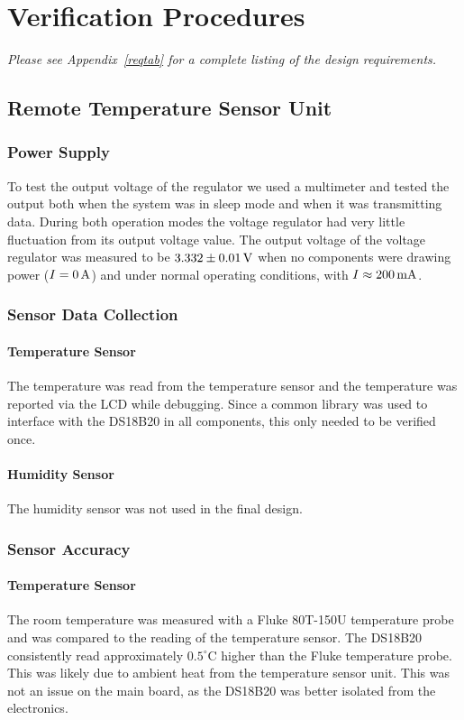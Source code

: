 \section{Verification Procedures}
\emph{Please see Appendix~\ref{reqtab} for a complete listing of the design requirements.}
\subsection{Remote Temperature Sensor Unit}
\subsubsection{Power Supply}
To test the output voltage of the regulator we used a multimeter and tested the output both when the system was in sleep mode and when it was transmitting data. During both operation modes the voltage regulator had very little fluctuation from its output voltage value. The output voltage of the voltage regulator was measured to be $3.332 \pm 0.01\mbox{\,V}$ when no components were drawing power ($I=0\mbox{\,A}$) and under normal operating conditions, with $I\approx200\mbox{\,mA}$. 

\subsubsection{Sensor Data Collection}
\paragraph{Temperature Sensor}
The temperature was read from the temperature sensor and the temperature was reported via the LCD while debugging.  Since a common library was used to interface with the DS18B20 in all components, this only needed to be verified once.

\paragraph{Humidity Sensor}
The humidity sensor was not used in the final design.

\subsubsection{Sensor Accuracy}
\paragraph{Temperature Sensor}
The room temperature was measured with a Fluke 80T-150U temperature probe and was compared to the reading of the temperature sensor.  The DS18B20 consistently read approximately $0.5^\circ$C higher than the Fluke temperature probe.  This was likely due to ambient heat from the temperature sensor unit.  This was not an issue on the main board, as the DS18B20 was better isolated from the electronics.

